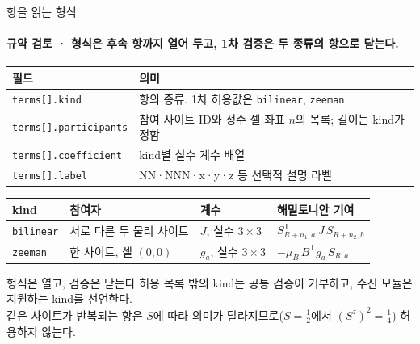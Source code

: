 \begin{frame}[label=term-schema]{항을 읽는 형식}
  \framesubtitle{규약 검토 · 형식은 후속 항까지 열어 두고, 1차 검증은 두 종류의 항으로 닫는다.}
  \small\renewcommand{\arraystretch}{1.12}
  \begin{tabularx}{\textwidth}{@{}p{4.1cm}Y@{}}
    \toprule
    필드 & 의미 \\
    \midrule
    \texttt{terms[].kind} & 항의 종류. 1차 허용값은 \texttt{bilinear}, \texttt{zeeman} \\
    \texttt{terms[].participants} & 참여 사이트 ID와 정수 셀 좌표 $n$의 목록; 길이는 kind가 정함 \\
    \texttt{terms[].coefficient} & kind별 실수 계수 배열 \\
    \texttt{terms[].label} & NN·NNN·x·y·z 등 선택적 설명 라벨 \\
    \bottomrule
  \end{tabularx}
  \par\smallskip
  \begin{tabularx}{\textwidth}{@{}p{1.6cm}p{3.2cm}p{2.6cm}Y@{}}
    \toprule
    kind & 참여자 & 계수 & 해밀토니안 기여 \\
    \midrule
    \texttt{bilinear} & 서로 다른 두 물리 사이트 & $J$, 실수 $3\times3$ & $S_{R+n_1,a}^{\mathsf T}\,J\,S_{R+n_2,b}$ \\
    \texttt{zeeman} & 한 사이트, 셀 $(0,0)$ & $g_a$, 실수 $3\times3$ & $-\mu_B\,B^{\mathsf T}g_a\,S_{R,a}$ \\
    \bottomrule
  \end{tabularx}
  \par\smallskip
  \begin{band}{형식은 열고, 검증은 닫는다}
    허용 목록 밖의 kind는 공통 검증이 거부하고, 수신 모듈은 지원하는 kind를 선언한다.\\
    같은 사이트가 반복되는 항은 $S$에 따라 의미가 달라지므로($S=\tfrac12$에서 $(S^z)^2=\tfrac14$) 허용하지 않는다.
  \end{band}
\end{frame}

